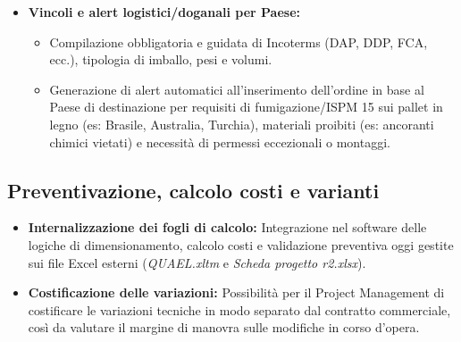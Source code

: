 \begin{itemize}
\begin{itemize}
                        (es. Globosili esterni in zone sismiche), definire i trasporti e rilevare limitazioni d'uso dei componenti.
            \end{itemize}
      \item \textbf{Vincoli e alert logistici/doganali per Paese:}
            \begin{itemize}
                  \item Compilazione obbligatoria e guidata di Incoterms (DAP, DDP, FCA, ecc.), tipologia di imballo, pesi e volumi.
                  \item Generazione di alert automatici all'inserimento dell'ordine in base al Paese di destinazione per requisiti
                        di fumigazione/ISPM 15 sui pallet in legno (es: Brasile, Australia, Turchia), materiali proibiti
                        (es: ancoranti chimici vietati) e necessità di permessi eccezionali o montaggi.
            \end{itemize}
\end{itemize}

\subsection{Preventivazione, calcolo costi e varianti}
\begin{itemize}
      \item \textbf{Internalizzazione dei fogli di calcolo:} Integrazione nel software delle logiche di dimensionamento,
            calcolo costi e validazione preventiva oggi gestite sui file Excel esterni (\textit{QUAEL.xltm}
            e \textit{Scheda progetto r2.xlsx}).
      \item \textbf{Costificazione delle variazioni:} Possibilità per il Project Management di costificare le variazioni
            tecniche in modo separato dal contratto commerciale, così da valutare il margine di manovra sulle modifiche in corso d'opera.
\end{itemize}

